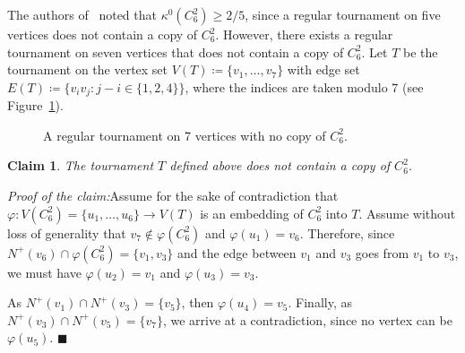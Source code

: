 \documentclass[11pt]{amsart}
\newtheorem{claim}[theorem]{Claim}
\newenvironment{claimproof}[1]{\par\noindent\textit{Proof of the claim:}\space#1}{\leavevmode\unskip\penalty9999 \hbox{}\nobreak\hfill\quad\hbox{$\blacksquare$}}
\begin{document}
The authors of~\cite{DHLMPT} noted that $\kappa^0(C_6^2) \ge 2/5$, since a regular tournament on five vertices does not contain a copy of $C_{6}^2$. However, there exists a regular tournament on seven vertices that does not contain a copy of $C_6^2$.
Let $T$ be the tournament on the vertex set $V(T) \coloneqq \{ v_1, \dots, v_7\}$ with edge set $E(T) \coloneqq \{ v_i v_j : j-i \in \{1,2,4\} \} $, where the indices are taken modulo 7 (see Figure~\ref{fig:tourn_T}). 

\begin{figure}
    \centering
    \caption{A regular tournament on 7 vertices with no copy of $C_6^2$.}
    \label{fig:tourn_T}
\end{figure}

\begin{claim} \label{claim:c62free}
    The tournament $T$ defined above does not contain a copy of $C_6^2$.
\end{claim}

\begin{claimproof}
    Assume for the sake of contradiction that $\varphi: V(C_6^2) = \{u_1, \dots, u_6\} \to V(T)$ is an embedding of $C_6^2$ into $T$. Assume without loss of generality that $v_7 \notin \varphi(C_6^2)$ and $\varphi(u_1) = v_6$. Therefore, since $N^+(v_6) \cap \varphi(C_6^2) = \{ v_1, v_3 \}$ and the edge between $v_1$ and $v_3$ goes from $v_1$ to $v_3$, we must have $\varphi(u_2) = v_1$ and $\varphi(u_3) = v_3$.

    As $N^+(v_1) \cap N^+(v_3) = \{v_5\}$, then $\varphi(u_4) = v_5$. Finally, as $N^+(v_3) \cap N^+(v_5) = \{ v_7 \}$, we arrive at a contradiction, since no vertex can be $\varphi(u_5)$.
\end{claimproof}
\end{document}
